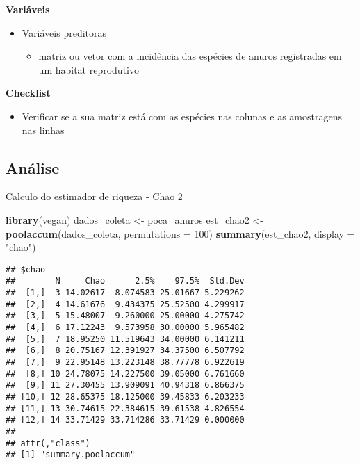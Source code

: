 \documentclass[
]{book}
\newenvironment{Shaded}{\begin{snugshade}}{\end{snugshade}}
\newcommand{\DataTypeTok}[1]{\textcolor[rgb]{0.13,0.29,0.53}{#1}}
\newcommand{\DecValTok}[1]{\textcolor[rgb]{0.00,0.00,0.81}{#1}}
\newcommand{\KeywordTok}[1]{\textcolor[rgb]{0.13,0.29,0.53}{\textbf{#1}}}
\newcommand{\NormalTok}[1]{#1}
\newcommand{\StringTok}[1]{\textcolor[rgb]{0.31,0.60,0.02}{#1}}
\providecommand{\tightlist}{%
  \setlength{\itemsep}{0pt}\setlength{\parskip}{0pt}}
\begin{document}
\textbf{Variáveis}

\begin{itemize}
\tightlist
\item
  Variáveis preditoras

  \begin{itemize}
  \tightlist
  \item
    matriz ou vetor com a incidência das espécies de anuros registradas em um habitat reprodutivo
  \end{itemize}
\end{itemize}

\textbf{Checklist}

\begin{itemize}
\tightlist
\item
  Verificar se a sua matriz está com as espécies nas colunas e as amostragens nas linhas
\end{itemize}

\hypertarget{anuxe1lise-2}{%
\subsection{Análise}\label{anuxe1lise-2}}

Calculo do estimador de riqueza - Chao 2

\begin{Shaded}
\begin{Highlighting}[]
\KeywordTok{library}\NormalTok{(vegan)}
\NormalTok{dados_coleta <-}\StringTok{ }\NormalTok{poca_anuros}
\NormalTok{est_chao2 <-}\StringTok{ }\KeywordTok{poolaccum}\NormalTok{(dados_coleta, }\DataTypeTok{permutations =} \DecValTok{100}\NormalTok{)}
\KeywordTok{summary}\NormalTok{(est_chao2, }\DataTypeTok{display =} \StringTok{"chao"}\NormalTok{)}
\end{Highlighting}
\end{Shaded}

\begin{verbatim}
## $chao
##        N     Chao      2.5%    97.5%  Std.Dev
##  [1,]  3 14.02617  8.074583 25.01667 5.229262
##  [2,]  4 14.61676  9.434375 25.52500 4.299917
##  [3,]  5 15.48007  9.260000 25.00000 4.275742
##  [4,]  6 17.12243  9.573958 30.00000 5.965482
##  [5,]  7 18.95250 11.519643 34.00000 6.141211
##  [6,]  8 20.75167 12.391927 34.37500 6.507792
##  [7,]  9 22.95148 13.223148 38.77778 6.922619
##  [8,] 10 24.78075 14.227500 39.05000 6.761660
##  [9,] 11 27.30455 13.909091 40.94318 6.866375
## [10,] 12 28.65375 18.125000 39.45833 6.203233
## [11,] 13 30.74615 22.384615 39.61538 4.826554
## [12,] 14 33.71429 33.714286 33.71429 0.000000
## 
## attr(,"class")
## [1] "summary.poolaccum"
\end{verbatim}
\end{document}
